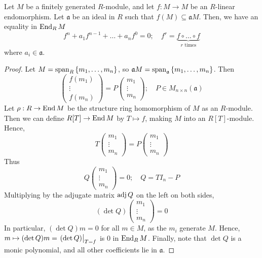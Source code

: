 \begin{proposition}
    Let \( M \) be a finitely generated \( R \)-module, and let \( f : M \to M \) be an \( R \)-linear endomorphism.
    Let \( \mathfrak a \) be an ideal in \( R \) such that \( f(M) \subseteq \mathfrak a M \).
    Then, we have an equality in \( \operatorname{End}_R M \)
    \[ f^n + a_1 f^{n-1} + \dots + a_n f^0 = 0;\quad f^r = \underbrace{f \circ \dots \circ f}_{r \text{ times}} \]
    where \( a_i \in \mathfrak a \).
\end{proposition}
\begin{proof}
    Let \( M = \operatorname{span}_R\qty{m_1, \dots, m_n} \), so \( \mathfrak a M = \operatorname{span}_{\mathfrak a} \qty{m_1, \dots, m_n} \).
    Then
    \[ \begin{pmatrix}
        f(m_1) \\
        \vdots \\
        f(m_n)
    \end{pmatrix} = P \begin{pmatrix}
        m_1 \\
        \vdots \\
        m_n
    \end{pmatrix};\quad P \in M_{n \times n}(\mathfrak a) \]
    Let \( \rho : R \to \operatorname{End} M \) be the structure ring homomorphism of \( M \) as an \( R \)-module.
    Then we can define \( R[T] \to \operatorname{End} M \) by \( T \mapsto f \), making \( M \) into an \( R[T] \)-module.
    Hence,
    \[ T \begin{pmatrix}
        m_1 \\
        \vdots \\
        m_n
    \end{pmatrix} = P \begin{pmatrix}
        m_1 \\
        \vdots \\
        m_n
    \end{pmatrix} \]
    Thus
    \[ Q \begin{pmatrix}
        m_1 \\
        \vdots \\
        m_n
    \end{pmatrix} = 0;\quad Q = T I_n - P \]
    Multiplying by the adjugate matrix \( \operatorname{adj} Q \) on the left on both sides,
    \[ (\det Q) \begin{pmatrix}
        m_1 \\
        \vdots \\
        m_n
    \end{pmatrix} = 0 \]
    In particular, \( (\det Q) m = 0 \) for all \( m \in M \), as the \( m_i \) generate \( M \).
    Hence, \( m \mapsto (\det Q) m = \eval{(\det Q)}_{T = f} \) is \( 0 \) in \( \operatorname{End}_R M \).
    Finally, note that \( \det Q \) is a monic polynomial, and all other coefficients lie in \( \mathfrak a \).
\end{proof}
